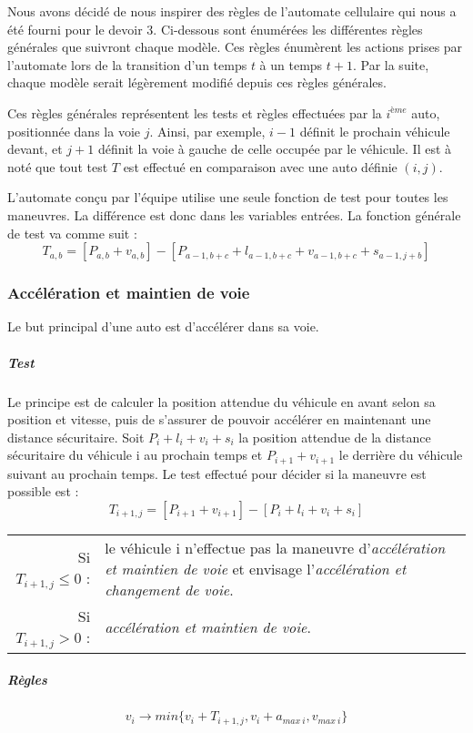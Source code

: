 \documentclass[12pt,letterpaper]{article}
\begin{document}
Nous avons décidé de nous inspirer des règles de l'automate cellulaire qui nous a été fourni pour le devoir 3. Ci-dessous sont énumérées les différentes règles générales que suivront chaque modèle. Ces règles énumèrent les actions prises par l'automate lors de la transition d'un temps $t$ à un temps $t+1$. Par la suite, chaque modèle serait légèrement modifié depuis ces règles générales. %

Ces règles générales représentent les tests et règles effectuées par la $i^{ème}$ auto, positionnée dans la voie $j$. Ainsi, par exemple, $i-1$ définit le prochain véhicule devant, et $j+1$ définit la voie à gauche de celle occupée par le véhicule. Il est à noté que tout test $T$ est effectué en comparaison avec une auto définie $(i,j)$. 

L'automate conçu par l'équipe utilise une seule fonction de test pour toutes les maneuvres. La différence est donc dans les variables entrées. La fonction générale de test va comme suit : 
\begin{equation}
T_{a,b}	= [P_{a,b}+v_{a,b}] - [P_{a-1,b+c}+l_{a-1,b+c}+v_{a-1,b+c}+s_{a-1,j+b}]
\end{equation}

\subsubsection{Accélération et maintien de voie}
Le but principal d'une auto est d'accélérer dans sa voie.
\subparagraph{Test} Le principe est de calculer la position attendue du véhicule en avant selon sa position et vitesse, puis de s'assurer de pouvoir accélérer en maintenant une distance sécuritaire. Soit $P_{i}+l_{i}+v_{i}+s_{i}$ la position attendue de la distance sécuritaire du véhicule i au prochain temps et $P_{i+1}+v_{i+1}$ le derrière du véhicule suivant au prochain temps. Le test effectué pour décider si la maneuvre est possible est :
$$T_{i+1,j} = [P_{i+1}+v_{i+1}]-[P_{i}+l_{i}+v_{i}+s_{i}]$$

\begin{tabular}{r p{12cm}}
Si $T_{i+1,j} \leq 0$ : & le véhicule i n'effectue pas la maneuvre d'\textit{accélération et maintien de voie} et envisage l'\textit{accélération et changement de voie}. \\
Si $T_{i+1,j} > 0$ : & \textit{accélération et maintien de voie}.  
\end{tabular}
\subparagraph{Règles}
\begin{equation}
v_{i} \rightarrow min\{v_{i}+T_{i+1,j}, v_{i} + a_{max\: i}, v_{max\: i}\}
\end{equation}
\end{document}
